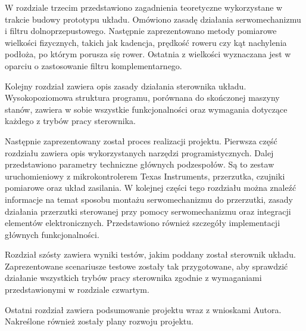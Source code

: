 W rozdziale trzecim przedstawiono zagadnienia teoretyczne wykorzystane w trakcie budowy prototypu układu. Omówiono zasadę działania serwomechanizmu i filtru dolnoprzepustowego. Następnie zaprezentowano metody pomiarowe wielkości fizycznych, takich jak kadencja, prędkość roweru czy kąt nachylenia podłoża, po którym porusza się rower. Ostatnia z wielkości wyznaczana jest w oparciu o zastosowanie filtru komplementarnego.

Kolejny rozdział zawiera opis zasady działania sterownika układu. Wysokopoziomowa struktura programu, porównana do skończonej maszyny stanów, zawiera w sobie wszystkie funkcjonalności oraz wymagania dotyczące każdego z trybów pracy sterownika. 

Następnie zaprezentowany został proces realizacji projektu. Pierwsza część rozdziału zawiera opis wykorzystanych narzędzi programistycznych. Dalej przedstawiono parametry techniczne głównych podzespołów. Są to zestaw uruchomieniowy z mikrokontrolerem Texas Instruments, przerzutka, czujniki pomiarowe oraz układ zasilania. W kolejnej części tego rozdziału można znaleźć informacje na temat sposobu montażu serwomechanizmu do przerzutki, zasady działania przerzutki sterowanej przy pomocy serwomechanizmu oraz integracji elementów elektronicznych. Przedstawiono również szczegóły implementacji głównych funkcjonalności.

Rozdział szósty zawiera wyniki testów, jakim poddany został sterownik układu. Zaprezentowane scenariusze testowe zostały tak przygotowane, aby sprawdzić działanie wszystkich trybów pracy sterownika zgodnie z wymaganiami przedstawionymi w rozdziale czwartym.

Ostatni rozdział zawiera podsumowanie projektu wraz z wnioskami Autora. Nakreślone również zostały plany rozwoju projektu.